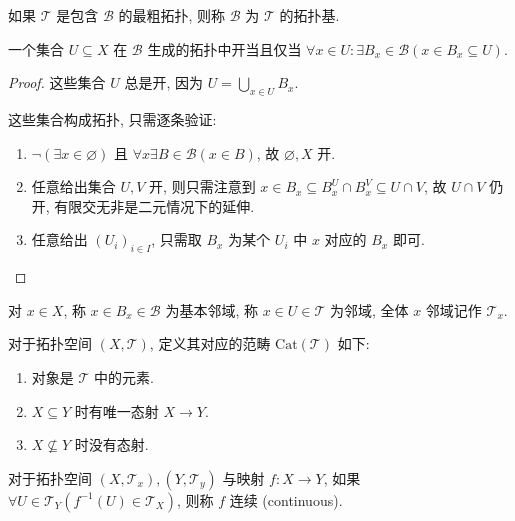 \begin{definition}
    如果 \(\mathcal{T}\) 是包含 \(\mathcal{B}\) 的最粗拓扑, 则称 \(\mathcal{B}\) 为 \(\mathcal{T}\) 的拓扑基.
\end{definition}

\begin{lemma}
    一个集合 \(U \subseteq X\) 在 \(\mathcal{B}\) 生成的拓扑中开当且仅当 \(\forall x \in U : \exists B_x \in \mathcal{B} (x \in B_x \subseteq U)\).

    \begin{proof}
        这些集合 \(U\) 总是开, 因为 \(U = \bigcup_{x \in U} B_x\).

        这些集合构成拓扑, 只需逐条验证:
        \begin{enumerate}
            \item \(\neg (\exists x \in \varnothing)\) 且 \(\forall x \exists B \in \mathcal{B} (x \in B)\), 故 \(\varnothing, X\) 开.
            \item 任意给出集合 \(U,V\) 开, 则只需注意到 \(x \in B_x \subseteq B_x^U \cap B_x^V \subseteq U \cap V\), 故 \(U \cap V\) 仍开, 有限交无非是二元情况下的延伸.
            \item 任意给出 \({(U_i)}_{i \in I}\), 只需取 \(B_x\) 为某个 \(U_i\) 中 \(x\) 对应的 \(B_x\) 即可.
        \end{enumerate}
    \end{proof}
\end{lemma}

\begin{definition}
    对 \(x \in X\), 称 \(x \in B_x \in \mathcal{B}\) 为基本邻域, 称 \(x \in U \in \mathcal{T}\) 为邻域,
    全体 \(x\) 邻域记作 \(\mathcal{T}_x\).
\end{definition}

\begin{definition}
    \label {definition:topological space's category}
    对于拓扑空间 \((X,\mathcal{T})\), 定义其对应的范畴 \(\mathrm{Cat} (\mathcal{T})\) 如下:

    \begin{enumerate}
        \item 对象是 \(\mathcal{T}\) 中的元素.
        \item \(X \subseteq Y\) 时有唯一态射 \(X \to Y\).
        \item \(X \nsubseteq Y\) 时没有态射.
    \end{enumerate}
\end{definition}

\begin{definition}
    对于拓扑空间 \((X,\mathcal{T}_x), (Y,\mathcal{T}_y)\) 与映射 \(f : X \to Y\),
    如果 \(\forall U \in \mathcal{T}_Y (f^{-1} (U) \in \mathcal{T}_X)\), 则称 \(f\) 连续 (continuous).
\end{definition}

